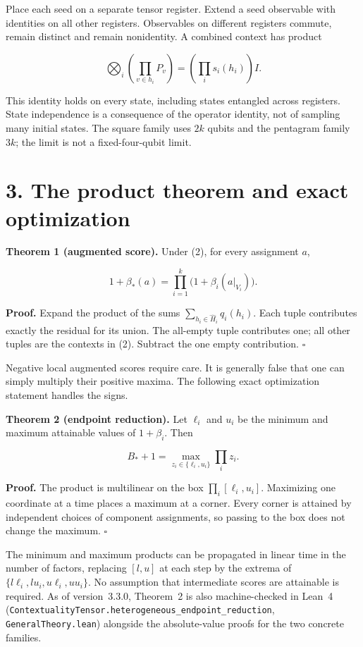 \documentclass[10pt,a4paper]{article}
\begin{document}
Place each seed on a separate tensor register. Extend a seed observable with identities on all other registers. Observables on different registers commute, remain distinct and remain nonidentity. A combined context has product

\[\bigotimes_i\left(\prod_{v\in h_i}P_v\right)
=\left(\prod_i s_i(h_i)\right)I. \tag{5}\]

This identity holds on every state, including states entangled across registers. State independence is a consequence of the operator identity, not of sampling many initial states. The square family uses \(2k\) qubits and the pentagram family \(3k\); the limit is not a fixed-four-qubit limit.

\section{3. The product theorem and exact optimization}\label{the-product-theorem-and-exact-optimization}

\textbf{Theorem 1 (augmented score).} Under (2), for every assignment \(a\),

\[1+\beta_*(a)=\prod_{i=1}^k\bigl(1+\beta_i(a|_{V_i})\bigr). \tag{6}\]

\textbf{Proof.} Expand the product of the sums \(\sum_{h_i\in\widehat H_i}q_i(h_i)\). Each tuple contributes exactly the residual for its union. The all-empty tuple contributes one; all other tuples are the contexts in (2). Subtract the one empty contribution. \(\square\)

Negative local augmented scores require care. It is generally false that one can simply multiply their positive maxima. The following exact optimization statement handles the signs.

\textbf{Theorem 2 (endpoint reduction).} Let \(\ell_i\) and \(u_i\) be the minimum and maximum attainable values of \(1+\beta_i\). Then

\[B_*+1=\max_{z_i\in\{\ell_i,u_i\}}\prod_i z_i. \tag{7}\]

\textbf{Proof.} The product is multilinear on the box \(\prod_i[\ell_i,u_i]\). Maximizing one coordinate at a time places a maximum at a corner. Every corner is attained by independent choices of component assignments, so passing to the box does not change the maximum. \(\square\)

The minimum and maximum products can be propagated in linear time in the number of factors, replacing \([l,u]\) at each step by the extrema of \(\{l\ell_i,lu_i,u\ell_i,uu_i\}\). No assumption that intermediate scores are attainable is required. As of version~3.3.0, Theorem~2 is also machine-checked in Lean~4 (\texttt{ContextualityTensor.heterogeneous\_endpoint\_reduction}, \texttt{GeneralTheory.lean}) alongside the absolute-value proofs for the two concrete families.
\end{document}
